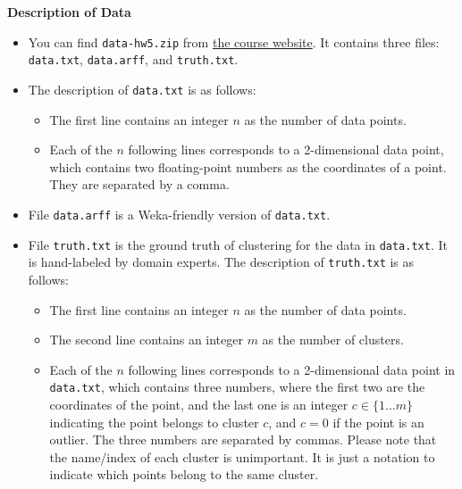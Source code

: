 \textbf{Description of Data}
\begin{itemize}
\item You can find {\tt data-hw5.zip} from \href{https://wiki.cites.illinois.edu/wiki/display/cs412fa15/Assignments}{the course website}. It contains three files: {\tt data.txt}, {\tt data.arff}, and {\tt truth.txt}.
\item The description of {\tt data.txt} is as follows:
\begin{itemize}
\item The first line contains an integer $n$ as the number of data points.
\item Each of the $n$ following lines corresponds to a 2-dimensional data point, which contains two floating-point numbers as the coordinates of a point. They are separated by a comma.


\end{itemize}
\item File {\tt data.arff} is a Weka-friendly version of {\tt data.txt}. 
\item File {\tt truth.txt} is the ground truth of clustering for the data in {\tt data.txt}. It is hand-labeled by domain experts. The description of {\tt truth.txt} is as follows:
\begin{itemize}
\item The first line contains an integer $n$ as the number of data points.
\item The second line contains an integer $m$ as the number of clusters.
\item Each of the $n$ following lines corresponds to a 2-dimensional data point in {\tt data.txt}, which contains three numbers, where the first two are the coordinates of the point, and the last one is an integer $c \in \{1 \ldots m\}$ indicating the point belongs to cluster $c$, and $c=0$ if the point is an outlier. The three numbers are separated by commas. Please note that the name/index of each cluster is unimportant. It is just a notation to indicate which points belong to the same cluster.
\end{itemize}
\end{itemize}

